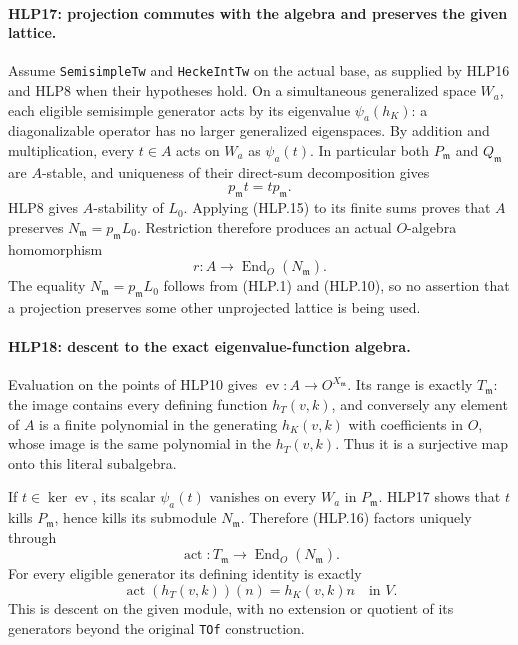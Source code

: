 \paragraph{HLP17: projection commutes with the algebra and preserves the given lattice.}
\label{claim:HLP17}
Assume \texttt{SemisimpleTw} and \texttt{HeckeIntTw} on the actual
base, as supplied by HLP16 and HLP8 when their hypotheses hold.
On a simultaneous generalized space \(W_a\), each eligible
semisimple generator acts by its eigenvalue \(\psi_a(h_K)\):
a diagonalizable operator has no larger generalized eigenspaces.
By addition and multiplication, every \(t\in A\) acts on
\(W_a\) as \(\psi_a(t)\). In particular both
\(P_{\mathfrak m}\) and \(Q_{\mathfrak m}\) are \(A\)-stable,
and uniqueness of their direct-sum decomposition gives
\[
                  p_{\mathfrak m}t=tp_{\mathfrak m}.  \tag{HLP.15}
\]
HLP8 gives \(A\)-stability of \(L_0\). Applying (HLP.15) to its
finite sums proves that \(A\) preserves
\(N_{\mathfrak m}=p_{\mathfrak m}L_0\). Restriction therefore
produces an actual \(O\)-algebra homomorphism
\[
          r:A\longrightarrow\operatorname{End}_O(N_{\mathfrak m}).
                                                               \tag{HLP.16}
\]
The equality \(N_{\mathfrak m}=p_{\mathfrak m}L_0\) follows from
(HLP.1) and (HLP.10), so no assertion that a projection preserves
some other unprojected lattice is being used.

\paragraph{HLP18: descent to the exact eigenvalue-function algebra.}
\label{claim:HLP18}
Evaluation on the points of HLP10 gives
\(\operatorname{ev}:A\to O^{X_{\mathfrak m}}\).
Its range is exactly \(T_{\mathfrak m}\): the image contains every
defining function \(h_T(v,k)\), and conversely any element of
\(A\) is a finite polynomial in the generating \(h_K(v,k)\)
with coefficients in \(O\), whose image is the same polynomial
in the \(h_T(v,k)\). Thus it is a surjective map onto this literal
subalgebra.

If \(t\in\ker\operatorname{ev}\), its scalar \(\psi_a(t)\)
vanishes on every \(W_a\) in \(P_{\mathfrak m}\). HLP17 shows
that \(t\) kills \(P_{\mathfrak m}\), hence kills its submodule
\(N_{\mathfrak m}\). Therefore (HLP.16) factors uniquely through
\[
 \operatorname{act}:T_{\mathfrak m}
                       \longrightarrow\operatorname{End}_O(N_{\mathfrak m}).
                                                               \tag{HLP.17}
\]
For every eligible generator its defining identity is exactly
\[
 \operatorname{act}(h_T(v,k))(n)
                    =h_K(v,k)n\quad\text{in }V.       \tag{HLP.18}
\]
This is descent on the given module, with no extension or quotient
of its generators beyond the original \texttt{TOf} construction.

